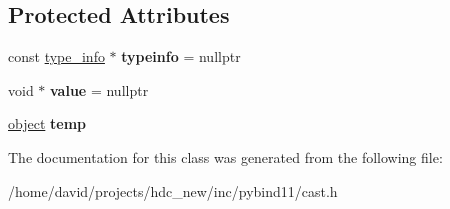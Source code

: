 \subsection*{Protected Attributes}
\begin{DoxyCompactItemize}
\item 
const \hyperlink{structtype__info}{type\+\_\+info} $\ast$ {\bfseries typeinfo} = nullptr\hypertarget{classtype__caster__generic_ae0fcfb286c3f28721b89b077a9e1fe6d}{}\label{classtype__caster__generic_ae0fcfb286c3f28721b89b077a9e1fe6d}

\item 
void $\ast$ {\bfseries value} = nullptr\hypertarget{classtype__caster__generic_a077b8d1e4af829443b2e41c3e5786f4d}{}\label{classtype__caster__generic_a077b8d1e4af829443b2e41c3e5786f4d}

\item 
\hyperlink{classobject}{object} {\bfseries temp}\hypertarget{classtype__caster__generic_ae3319201334c46344051dd6620c065ef}{}\label{classtype__caster__generic_ae3319201334c46344051dd6620c065ef}

\end{DoxyCompactItemize}


The documentation for this class was generated from the following file\+:\begin{DoxyCompactItemize}
\item 
/home/david/projects/hdc\+\_\+new/inc/pybind11/cast.\+h\end{DoxyCompactItemize}
